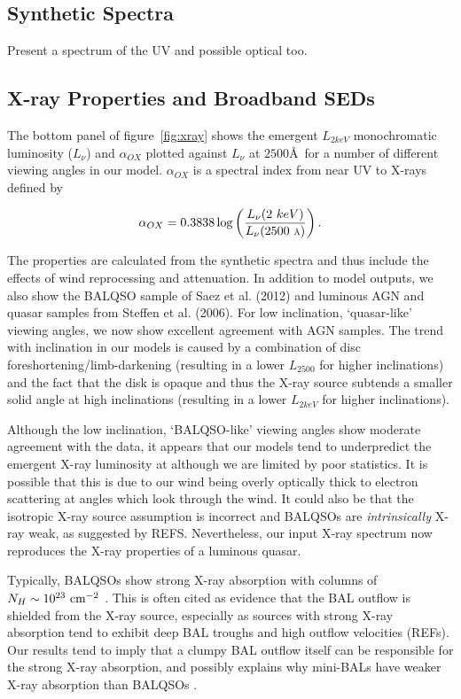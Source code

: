 \documentclass[useAMS,usenatbib]{mn2e_x}
\begin{document}
\subsection{Synthetic Spectra}

Present a spectrum of the UV and possible optical too. 



\subsection{X-ray Properties and Broadband SEDs}

The bottom panel of figure~\ref{fig:xray} shows the emergent $L_{2keV}$ 
monochromatic luminosity ($L_\nu$) and $\alpha_{OX}$ plotted against 
$L_\nu$ at $2500$\AA\ for a number of different viewing angles in our model.
$\alpha_{OX}$ is a spectral index from near UV to X-rays defined by

\begin{equation}
\alpha_{OX}=0.3838\log\left(\frac{L_{\nu}(2~keV)}{L_{\nu}(2500~\mbox{\scriptsize{\AA}})}\right).
\end{equation}

The properties are calculated from the synthetic spectra and thus include
the effects of wind reprocessing and attenuation. In addition to model outputs,
we also show the BALQSO sample of Saez et al. (2012) and luminous AGN and quasar
samples from Steffen et al. (2006). For low inclination, `quasar-like' viewing angles,
we now show excellent agreement with AGN samples. The trend with inclination
in our models is caused by a combination of disc foreshortening/limb-darkening 
(resulting in a lower $L_{2500}$ for higher inclinations) and the fact that the disk 
is opaque and thus the X-ray source subtends a smaller solid angle at high inclinations
(resulting in a lower $L_{2keV}$ for higher inclinations). 

Although the low inclination, `BALQSO-like' viewing angles show moderate agreement with the data,
it appears that our models tend to underpredict the emergent X-ray luminosity at 
although we are limited by poor statistics. 
It is possible that this is due to our wind being overly optically thick to 
electron scattering at angles which look through the wind. It could also be that the
isotropic X-ray source assumption is incorrect and BALQSOs are {\em intrinsically} 
X-ray weak, as suggested by REFS. Nevertheless, our input X-ray spectrum
now reproduces the X-ray properties of a luminous quasar.

Typically, BALQSOs show strong X-ray absorption with columns 
of $N_H\sim10^{23}~\rm{cm^{-2}}$ 
\citep{green1996,brandt2000,mathur2000,green2001,grupemathur2003}.
This is often cited as evidence that the BAL outflow is shielded from
the X-ray source, especially as sources with strong X-ray absorption tend
to exhibit deep BAL troughs and high outflow velocities (REFs).
Our results tend to imply that a clumpy BAL outflow
itself can be responsible for the strong X-ray absorption, and possibly 
explains why mini-BALs have weaker X-ray absorption than BALQSOs 
\citep[e.g.][]{brandt2000,hamann2013}.
\end{document}
